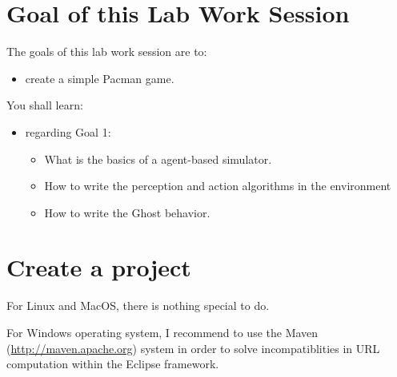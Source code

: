 \documentclass[article,english,nodocumentinfo,nosayenslogo,noicartslogo]{utbmciadreport}
\begin{document}
\section{Goal of this Lab Work Session}

The goals of this lab work session are to:
\begin{itemize}
\item create a simple Pacman game.
\end{itemize}

You shall learn: 
\begin{itemize}
\item regarding Goal 1:
	\begin{itemize}
	\item What is the basics of a agent-based simulator.
	\item How to write the perception and action algorithms in the environment
	\item How to write the Ghost behavior.
	\end{itemize}
\end{itemize}



\section{Create a project}

For Linux and MacOS, there is nothing special to do.

For Windows operating system, I recommend to use the Maven (\url{http://maven.apache.org}) system in order to solve incompatiblities in URL computation within the Eclipse framework.
\end{document}
